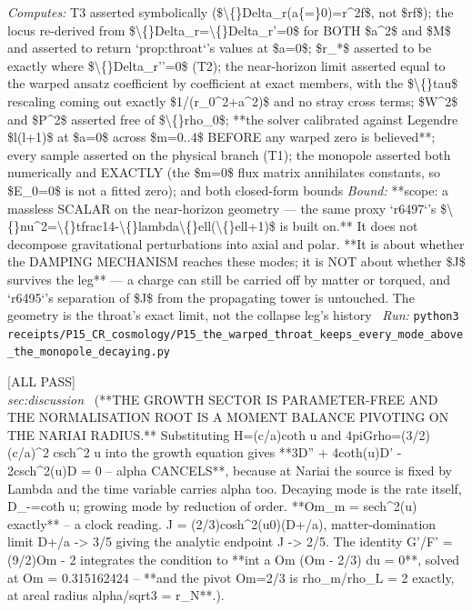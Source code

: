 \begin{description}
\emph{Computes:} T3 asserted symbolically (\$\textbackslash\{\}Delta\_r(a\{=\}0)=r\textasciicircum{}2f\$, not \$rf\$); the locus re-derived from \$\textbackslash\{\}Delta\_r=\textbackslash\{\}Delta\_r'=0\$ for BOTH \$a\textasciicircum{}2\$ and \$M\$ and asserted to return `prop:throat`'s values at \$a=0\$; \$r\_*\$ asserted to be exactly where \$\textbackslash\{\}Delta\_r''=0\$ (T2); the near-horizon limit asserted equal to the warped ansatz coefficient by coefficient at exact members, with the \$\textbackslash\{\}tau\$ rescaling coming out exactly \$1/(r\_0\textasciicircum{}2+a\textasciicircum{}2)\$ and no stray cross terms; \$W\textasciicircum{}2\$ and \$P\textasciicircum{}2\$ asserted free of \$\textbackslash\{\}rho\_0\$; **the solver calibrated against Legendre \$l(l+1)\$ at \$a=0\$ across \$m=0..4\$ BEFORE any warped zero is believed**; every sample asserted on the physical branch (T1); the monopole asserted both numerically and EXACTLY (the \$m=0\$ flux matrix annihilates constants, so \$E\_0=0\$ is not a fitted zero); and both closed-form bounds
 \emph{Bound:} **scope: a massless SCALAR on the near-horizon geometry --- the same proxy `r6497`'s \$\textbackslash\{\}nu\textasciicircum{}2=\textbackslash\{\}tfrac14-\textbackslash\{\}lambda\textbackslash\{\}ell(\textbackslash\{\}ell+1)\$ is built on.** It does not decompose gravitational perturbations into axial and polar.  **It is about whether the DAMPING MECHANISM reaches these modes; it is NOT about whether \$J\$ survives the leg** --- a charge can still be carried off by matter or torqued, and `r6495`'s separation of \$J\$ from the propagating tower is untouched. The geometry is the throat's exact limit, not the collapse leg's history
\ \emph{Run:} \texttt{python3 receipts/P15\_CR\_cosmology/P15\_the\_warped\_throat\_keeps\_every\_mode\_above\_the\_monopole\_decaying.py}
\item[\rcptlabel{P15_the_growth_root_is_a_moment_balance_pivoting_on_the_nariai_radius}{P15R12}\textbf{P15R12}\quad\texttt{P15\_the\_growth\_root\_is\_a\_moment\_balance\_pivoting\_on\_the\_nariai\_radius}]\hfill\textsf{[ALL PASS]}\\
\textit{sec:discussion} \ (**THE GROWTH SECTOR IS PARAMETER-FREE AND THE NORMALISATION ROOT IS A MOMENT BALANCE PIVOTING ON THE NARIAI RADIUS.** Substituting H=(c/a)coth u and 4piGrho=(3/2)(c/a)\textasciicircum{}2 csch\textasciicircum{}2 u into the growth equation gives **3D'' + 4coth(u)D' - 2csch\textasciicircum{}2(u)D = 0 -- alpha CANCELS**, because at Nariai the source is fixed by Lambda and the time variable carries alpha too. Decaying mode is the rate itself, D\_-=coth u; growing mode by reduction of order. **Om\_m = sech\textasciicircum{}2(u) exactly** -- a clock reading. J = (2/3)cosh\textasciicircum{}2(u0)(D+/a), matter-domination limit D+/a -> 3/5 giving the analytic endpoint J -> 2/5. The identity G'/F' = (9/2)Om - 2 integrates the condition to **int a Om (Om - 2/3) du = 0**, solved at Om = 0.315162424 -- **and the pivot Om=2/3 is rho\_m/rho\_L = 2 exactly, at areal radius alpha/sqrt3 = r\_N**.). 

\end{description}
